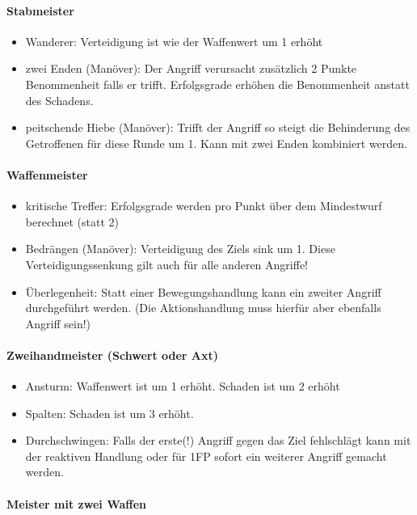 \documentclass{article}
\begin{document}
\paragraph{Stabmeister}

\begin{itemize}
\item Wanderer: Verteidigung ist wie der Waffenwert um 1 erhöht
\item zwei Enden (Manöver): Der Angriff verursacht zusätzlich 2 Punkte Benommenheit falls er trifft. Erfolgsgrade erhöhen die Benommenheit anstatt des Schadens.
\item peitschende Hiebe (Manöver): Trifft der Angriff so steigt die Behinderung des Getroffenen für diese Runde um 1. Kann mit zwei Enden kombiniert werden.
\end{itemize}

\paragraph{Waffenmeister}

\begin{itemize}
\item kritische Treffer: Erfolgsgrade werden pro Punkt über dem Mindestwurf berechnet (statt 2)
\item Bedrängen (Manöver): Verteidigung des Ziels sink um 1. Diese Verteidigungssenkung gilt auch für alle anderen Angriffe!
\item Überlegenheit: Statt einer Bewegungshandlung kann ein zweiter Angriff durchgeführt werden. (Die Aktionshandlung muss hierfür aber ebenfalls Angriff sein!)
\end{itemize}

\paragraph{Zweihandmeister (Schwert oder Axt)}

\begin{itemize}
\item Ansturm: Waffenwert ist um 1 erhöht. Schaden ist um 2 erhöht
\item Spalten: Schaden ist um 3 erhöht.
\item Durchschwingen: Falls der erste(!) Angriff gegen das Ziel fehlschlägt kann mit der reaktiven Handlung oder für 1FP sofort ein weiterer Angriff gemacht werden.
\end{itemize}

\paragraph{Meister mit zwei Waffen}
\end{document}
